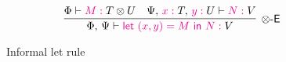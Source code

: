 \begin{figure}
\[\colored
\inference{
  \Tp{\Phi} \Tpvdash \Tmof{M} \Tp{T \otimes U} &
  \Tp{\Psi \comma \Tmof{x}T \comma \Tmof{y}U} \Tpvdash \Tmof{N} \Tp{V}
}{\otimes\elim}{
  \Tp{\Phi \comma \Psi} \Tpvdash \Tmof{\key{let}~(x,y) = M~\key{in}~N} \Tp{V}
}
\]
\caption{Informal let rule}
\label{fig:letscompare}
\end{figure}
